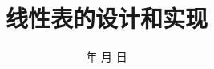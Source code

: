 \documentclass[
  verbose,
  language=chinese,
  profile=upc,
  type=bachelor-thesis,
  paper=a4,
  fontsize=12pt,
  pageInFloatRef=false
]{thesis}
\title{线性表的设计和实现}
\author{}
\date{\quad 年 \quad 月 \quad 日}
\begin{document}
  \maketitle

  \frontmatter

  
  
  

  \upcsetupfrontmatter
  \markboth{\UPCFixedHeaderText}{}
  \upcprinttableofcontents

  \mainmatter
  \upcsetupmainmatter

  
  
  
  
  

  \backmatter
  
  
  
\end{document}
